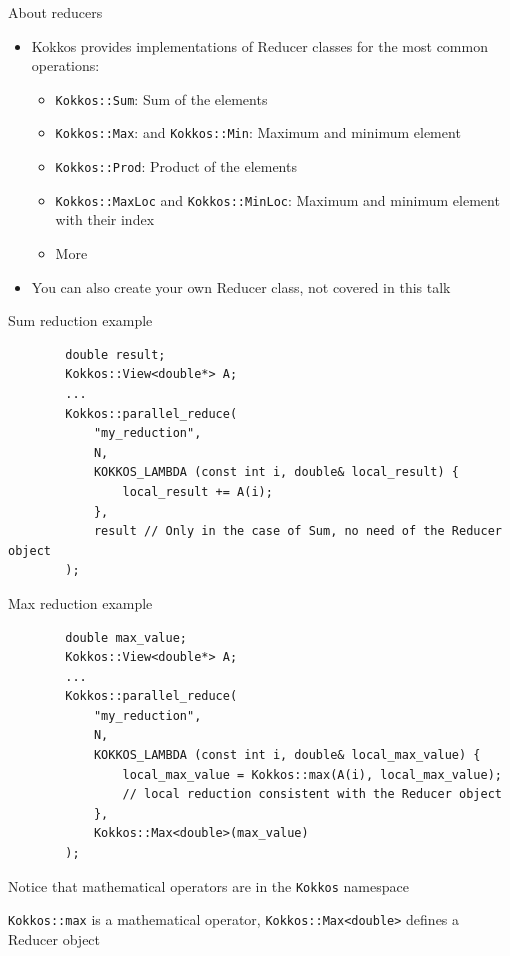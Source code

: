 \documentclass[
    aspectratio=169,
    \createHandout
]{beamer}
\begin{document}
\begin{frame}{About reducers}
    \begin{itemize}
        \item Kokkos provides implementations of Reducer classes for the most common operations:
        \begin{itemize}
            \item \texttt{Kokkos::Sum}: Sum of the elements
            \item \texttt{Kokkos::Max}: and \texttt{Kokkos::Min}: Maximum and minimum element
            \item \texttt{Kokkos::Prod}: Product of the elements
            \item \texttt{Kokkos::MaxLoc} and \texttt{Kokkos::MinLoc}: Maximum and minimum element with their index
            \item More 
        \end{itemize}
        \item You can also create your own Reducer class, not covered in this talk
    \end{itemize}
\end{frame}


\begin{frame}[fragile]{Sum reduction example}
    \begin{verbatim}
        double result;
        Kokkos::View<double*> A;
        ...
        Kokkos::parallel_reduce(
            "my_reduction",
            N,
            KOKKOS_LAMBDA (const int i, double& local_result) {
                local_result += A(i);
            },
            result // Only in the case of Sum, no need of the Reducer object
        );
    \end{verbatim}
\end{frame}


\begin{frame}[fragile]{Max reduction example}
    \begin{verbatim}
        double max_value;
        Kokkos::View<double*> A;
        ...
        Kokkos::parallel_reduce(
            "my_reduction",
            N,
            KOKKOS_LAMBDA (const int i, double& local_max_value) {
                local_max_value = Kokkos::max(A(i), local_max_value);
                // local reduction consistent with the Reducer object
            },
            Kokkos::Max<double>(max_value)
        );
    \end{verbatim}

    \pause

     Notice that mathematical operators are in the \texttt{Kokkos} namespace

    \pause

     \texttt{Kokkos::max} is a mathematical operator, \texttt{Kokkos::Max<double>} defines a Reducer object
\end{frame}
\end{document}
